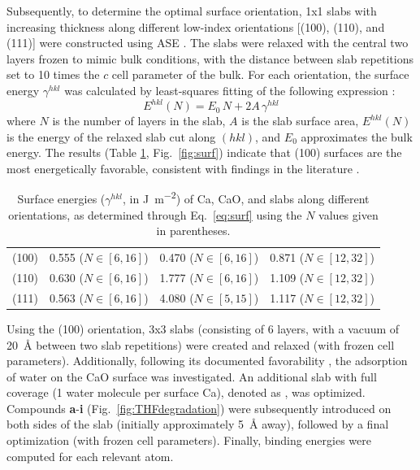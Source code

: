 \documentclass[12pt,a4paper]{article}
\begin{document}
Subsequently, to determine the optimal surface orientation, 1x1 slabs with increasing thickness along different low-index orientations [(100), (110), and (111)] were constructed using ASE \cite{larsenAtomicSimulationEnvironment2017}. The slabs were relaxed with the central two layers frozen to mimic bulk conditions, with the distance between slab repetitions set to 10 times the $c$ cell parameter of the bulk. For each orientation, the surface energy $\gamma^{hkl}$ was calculated by least-squares fitting of the following expression \cite{sunEfficientCreationConvergence2013,tranSurfaceEnergiesElemental2016}:
\begin{equation}
	E^{hkl}(N) = E_0\,N + 2A\,\gamma^{hkl} \label{eq:surf}
\end{equation}
where $N$ is the number of layers in the slab, $A$ is the slab surface area, $E^{hkl}(N)$ is the energy of the relaxed slab cut along $(hkl)$, and $E_0$ approximates the bulk energy. The results (Table \ref{tab:surf}, Fig.~\ref{fig:surf}) indicate that (100) surfaces are the most energetically favorable, consistent with findings in the literature \cite{deleeuwDensityFunctionalTheory2000,ebadiInsightsLiMetalOrganic2019}.

\begin{table}[!h]
	\centering
	\begin{tabular}{lccc}
		\toprule
		&	\ce{Ca} & \ce{CaO} &	\ce{CaH2} \\
		\midrule
		(100) & 0.555 ($N\in[6,16]$) & 0.470 ($N\in[6,16]$) & 0.871  ($N\in[12,32]$)\\
		(110) & 0.630  ($N\in[6,16]$)& 1.777  ($N\in[6,16]$)& 1.109 ($N\in[12,32]$)\\
		(111) & 0.563  ($N\in[6,16]$) & 4.080  ($N\in[5,15]$)  & 1.117   ($N\in[12,32]$) \\ 
		\bottomrule
	\end{tabular}
	\caption{Surface energies ($\gamma^{hkl}$, in \si{\joule\per\meter\squared}) of Ca, CaO, and  slabs along different orientations, as determined through Eq.~\eqref{eq:surf} using the $N$ values given in parentheses.}
	\label{tab:surf}
\end{table}

Using the (100) orientation, 3x3 slabs (consisting of 6 layers, with a vacuum of \SI{20}{\angstrom} between two slab repetitions) were created and relaxed (with frozen cell parameters). Additionally, following its documented favorability \cite{deleeuwDensityFunctionalTheory2000}, the adsorption of water on the CaO surface was investigated. An additional slab with full coverage (1 water molecule per surface Ca), denoted as , was optimized. Compounds \textbf{a}-\textbf{i} (Fig.~\ref{fig:THFdegradation}) were subsequently introduced on both sides of the slab (initially approximately \SI{5}{\angstrom} away), followed by a final optimization (with frozen cell parameters). Finally, binding energies were computed for each relevant atom.
\end{document}
